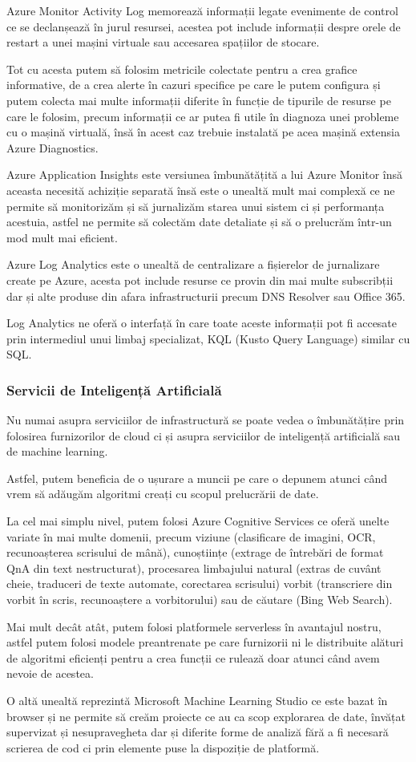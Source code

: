 Azure Monitor Activity Log memorează informații legate evenimente de control ce se
declanșează în jurul resursei, acestea pot include informații despre orele de 
restart a unei mașini virtuale sau accesarea spațiilor de stocare.

Tot cu acesta putem să folosim metricile colectate pentru a crea grafice informative,
de a crea alerte în cazuri specifice pe care le putem configura și putem 
colecta mai multe informații diferite în funcție de tipurile de resurse pe care le folosim,
precum informații ce ar putea fi utile în diagnoza unei probleme cu o mașină virtuală,
însă în acest caz trebuie instalată pe acea mașină extensia Azure Diagnostics.

Azure Application Insights este versiunea îmbunătățită a lui Azure Monitor însă aceasta
necesită achiziție separată însă este o unealtă mult mai complexă ce ne permite să 
monitorizăm și să jurnalizăm starea unui sistem ci și performanța acestuia, astfel
ne permite să colectăm date detaliate și să o prelucrăm într-un mod mult mai eficient.

Azure Log Analytics este o unealtă de centralizare a fișierelor de jurnalizare create 
pe Azure, acesta pot include resurse ce provin din mai multe subscribții dar și alte 
produse din afara infrastructurii precum DNS Resolver sau Office 365.

Log Analytics ne oferă o interfață în care toate aceste informații pot fi accesate
prin intermediul unui limbaj specializat, KQL (Kusto Query Language) similar cu SQL.

\subsubsection{Servicii de Inteligență Artificială}

Nu numai asupra serviciilor de infrastructură se poate vedea o îmbunătățire
prin folosirea furnizorilor de cloud ci și asupra serviciilor de inteligență artificială 
sau de machine learning.

Astfel, putem beneficia de o ușurare a muncii pe care o depunem atunci când
vrem să adăugăm algoritmi creați cu scopul prelucrării de date.

La cel mai simplu nivel, putem folosi Azure Cognitive Services ce oferă unelte variate
în mai multe domenii, precum viziune (clasificare de imagini, OCR, 
recunoașterea scrisului de mână), cunoștiințe (extrage de întrebări de format QnA din text nestructurat),
procesarea limbajului natural (extras de cuvânt cheie, traduceri de texte automate, corectarea scrisului)
vorbit (transcriere din vorbit în scris, recunoaștere a vorbitorului) sau de căutare (Bing Web Search).

Mai mult decât atât, putem folosi platformele serverless în avantajul nostru, astfel
putem folosi modele preantrenate pe care furnizorii ni le distribuite
alături de algoritmi eficienți pentru a crea funcții ce rulează
doar atunci când avem nevoie de acestea.

O altă unealtă reprezintă Microsoft Machine Learning Studio ce este bazat în browser 
și ne permite să creăm proiecte ce au ca scop explorarea de date, învățat supervizat
și nesupravegheta dar și diferite forme de analiză fără a fi necesară scrierea de cod
ci prin elemente puse la dispoziție de platformă.
